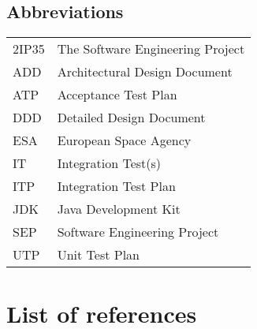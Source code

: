 \subsection{Abbreviations}
\label{subsec:abbrev}
\begin{tabular}{l|l}
2IP35 & The Software Engineering Project \\
ADD & Architectural Design Document \\
ATP & Acceptance Test Plan \\
DDD & Detailed Design Document \\
ESA & European Space Agency \\
IT & Integration Test(s) \\
ITP & Integration Test Plan \\
JDK   & Java Development Kit \\
SEP   & Software Engineering Project \\
UTP & Unit Test Plan \\
\end{tabular}

\section{List of references}
